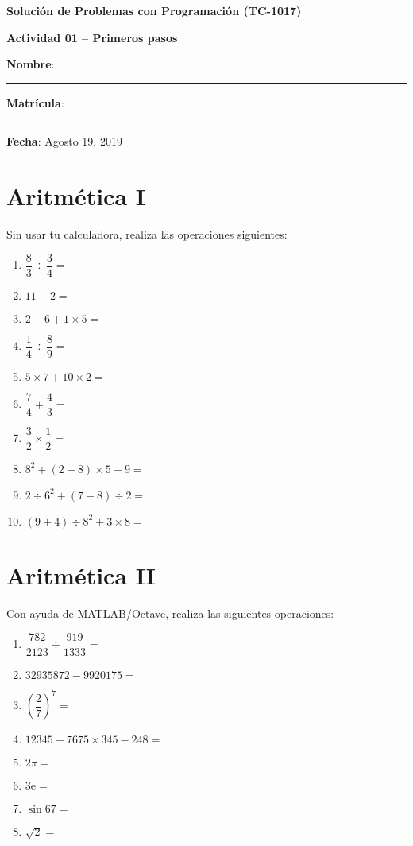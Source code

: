 \documentclass[spanish, 10pt]{article}
\begin{document}
\begin{center}
	{\Large \textbf{Solución de Problemas con Programación (TC-1017)}}
	
	\bigskip
	{\large \textbf{Actividad 01 -- Primeros pasos}}
\end{center}

\bigskip
{\large \textbf{Nombre}: \rule{14 cm}{0.4mm}}



\bigskip
{\large \textbf{Matrícula}: \rule{5 cm}{0.4mm}} \hfill {\large \textbf{Fecha}: Agosto 19, 2019}

\section{Aritmética I}

Sin usar tu calculadora, realiza las operaciones siguientes:

\begin{enumerate}[label=\alph*)]
	\item $\dfrac{8}{3} \div \dfrac{3}{4} =$
	\item $11 - 2 =$
	\item $2 - 6 + 1 \times 5 =$
	\item $\dfrac{1}{4} \div \dfrac{8}{9} =$
	\item $5 \times 7 + 10 \times 2 =$
	\item $\dfrac{7}{4} + \dfrac{4}{3} =$
	\item $\dfrac{3}{2} \times \dfrac{1}{2} =$
	\item $8^ 2 + (2+8) \times 5 - 9 =$
	\item $2 \div 6^2 + (7-8) \div 2 =$
	\item $(9 + 4) \div 8^2 + 3 \times 8 =$
\end{enumerate}

\section{Aritmética II}

Con ayuda de MATLAB/Octave, realiza las siguientes operaciones:

\begin{enumerate}[label=\alph*)]
	\item $\dfrac{782}{2123} \div \dfrac{919}{1333} =$
	\item $32935872 - 9920175 =$
	\item $\left( \dfrac{2}{7} \right)^{7} =$
	\item $12345 - 7675 \times 345 - 248 =$
	\item $2 \pi =$
	\item $3 \mathrm{e} =$
	\item $\sin 67 =$
	\item $\sqrt{2} =$
\end{enumerate}
\end{document}
